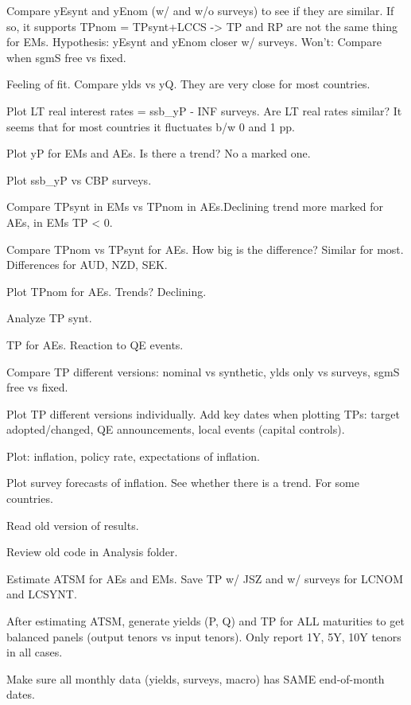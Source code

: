 \documentclass[12pt]{article}
\newcommand{\cmark}{\ding{51}}
\newcommand{\done}{\rlap{$\square$}{\raisebox{2pt}{\large\hspace{1pt}\cmark}}%
	\hspace{-2.5pt}}
\begin{document}
\begin{todolist}
	\item[\done] Compare yEsynt and yEnom (w/ and w/o surveys) to see if they are similar. If so, it supports TPnom = TPsynt+LCCS -> TP and RP are not the same thing for EMs. Hypothesis: yEsynt and yEnom  closer w/ surveys. Won't: Compare when sgmS free vs fixed.
	\item[\done] Feeling of fit. Compare ylds vs yQ. They are very close for most countries.
	\item[\done] Plot LT real interest rates = ssb_yP - INF surveys. Are LT real rates similar? It seems that for most countries it fluctuates b/w 0 and 1 pp.
	\item[\done] Plot yP for EMs and AEs. Is there a trend? No a marked one.
	\item[\done] Plot ssb_yP vs CBP surveys. 
	\item[\done] Compare TPsynt in EMs vs TPnom in AEs.Declining trend more marked for AEs, in EMs TP < 0.
	\item[\done] Compare TPnom vs TPsynt for AEs. How big is the difference? Similar for most. Differences for AUD, NZD, SEK.
	\item[\done] Plot TPnom for AEs. Trends? Declining.
	\item[\done] Analyze TP synt.
	\item[\done] TP for AEs. Reaction to QE events.
	\item[\done] Compare TP different versions: nominal vs synthetic, ylds only vs surveys, sgmS free vs fixed. 
	\item[\done] Plot TP different versions individually. Add key dates when plotting TPs: target adopted/changed, QE announcements, local events (capital controls). 
	\item[\done] Plot: inflation, policy rate, expectations of inflation.
	\item[\done] Plot survey forecasts of inflation. See whether there is a trend. For some countries.
	\item[\done] Read old version of results.
	\item[\done] Review old code in Analysis folder.	
	\item[\done] Estimate ATSM for AEs and EMs. Save TP w/ JSZ and w/ surveys for LCNOM and LCSYNT.
	\item[\done] After estimating ATSM, generate yields (P, Q) and TP for ALL maturities to get balanced panels (output tenors vs input tenors). Only report 1Y, 5Y, 10Y tenors in all cases.
	\item[\done] Make sure all monthly data (yields, surveys, macro) has SAME end-of-month dates.

\end{todolist}
\end{document}
